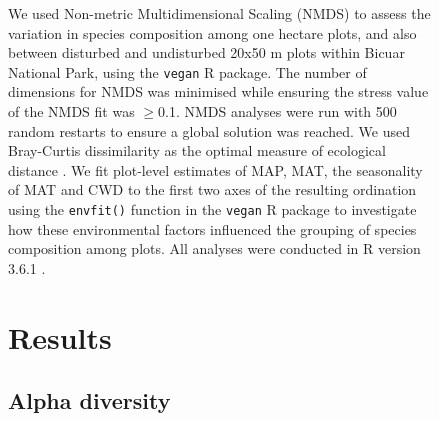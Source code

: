 \documentclass[diversity,article,submit,moreauthors,pdftex]{Definitions/mdpi}
\begin{document}
\begin{figure}[H]
We used Non-metric Multidimensional Scaling (NMDS) to assess the variation in species composition among one hectare plots, and also between disturbed and undisturbed 20x50 m plots within Bicuar National Park, using the \texttt{vegan} R package. The number of dimensions for NMDS was minimised while ensuring the stress value of the NMDS fit was $\ge$0.1. NMDS analyses were run with 500 random restarts to ensure a global solution was reached. We used Bray-Curtis dissimilarity as the optimal measure of ecological distance \citep{Legendre2013}. We fit plot-level estimates of MAP, MAT, the seasonality of MAT and CWD to the first two axes of the resulting ordination using the \texttt{envfit()} function in the \texttt{vegan} R package to investigate how these environmental factors influenced the grouping of species composition among plots. All analyses were conducted in R version 3.6.1 \citep{RCoreTeam2019}.


\section{Results}

\subsection{Alpha diversity}


\end{figure}
\end{document}
